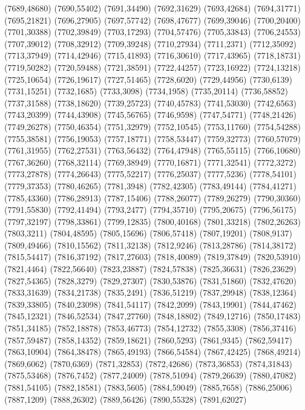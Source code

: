 (7689,48680)
(7690,55402)
(7691,34490)
(7692,31629)
(7693,42684)
(7694,31771)
(7695,21821)
(7696,27905)
(7697,57742)
(7698,47677)
(7699,39046)
(7700,20400)
(7701,30388)
(7702,39849)
(7703,17293)
(7704,57476)
(7705,33843)
(7706,24553)
(7707,39012)
(7708,32912)
(7709,39248)
(7710,27934)
(7711,2371)
(7712,35092)
(7713,37949)
(7714,42946)
(7715,41893)
(7716,30610)
(7717,43965)
(7718,18731)
(7719,50282)
(7720,59488)
(7721,38591)
(7722,44257)
(7723,16922)
(7724,13218)
(7725,10654)
(7726,19617)
(7727,51465)
(7728,6020)
(7729,44956)
(7730,6139)
(7731,15251)
(7732,1685)
(7733,3098)
(7734,1958)
(7735,20114)
(7736,58852)
(7737,31588)
(7738,18620)
(7739,25723)
(7740,45783)
(7741,53030)
(7742,6563)
(7743,20399)
(7744,43908)
(7745,56765)
(7746,9598)
(7747,54771)
(7748,21426)
(7749,26278)
(7750,46354)
(7751,32979)
(7752,10545)
(7753,11760)
(7754,54288)
(7755,38581)
(7756,19053)
(7757,18771)
(7758,53447)
(7759,32773)
(7760,57079)
(7761,31955)
(7762,27531)
(7763,56432)
(7764,47948)
(7765,55115)
(7766,10680)
(7767,36260)
(7768,32114)
(7769,38949)
(7770,16871)
(7771,32541)
(7772,3272)
(7773,27878)
(7774,26643)
(7775,52217)
(7776,25037)
(7777,5236)
(7778,54101)
(7779,37353)
(7780,46265)
(7781,3948)
(7782,42305)
(7783,49144)
(7784,41271)
(7785,43360)
(7786,28913)
(7787,15406)
(7788,26077)
(7789,26279)
(7790,30360)
(7791,55830)
(7792,41494)
(7793,2477)
(7794,35710)
(7795,20675)
(7796,56175)
(7797,32197)
(7798,33861)
(7799,12835)
(7800,40168)
(7801,33218)
(7802,26263)
(7803,3211)
(7804,48595)
(7805,15696)
(7806,57418)
(7807,19201)
(7808,9137)
(7809,49466)
(7810,15562)
(7811,32138)
(7812,9246)
(7813,28786)
(7814,38172)
(7815,54417)
(7816,37192)
(7817,27603)
(7818,40089)
(7819,37849)
(7820,53910)
(7821,4464)
(7822,56640)
(7823,23887)
(7824,57838)
(7825,36631)
(7826,23629)
(7827,54365)
(7828,3279)
(7829,27307)
(7830,53876)
(7831,51860)
(7832,47620)
(7833,31639)
(7834,21738)
(7835,2491)
(7836,51219)
(7837,29948)
(7838,12364)
(7839,33805)
(7840,23098)
(7841,54117)
(7842,2099)
(7843,19901)
(7844,47462)
(7845,12321)
(7846,52534)
(7847,27760)
(7848,18802)
(7849,12716)
(7850,17483)
(7851,34185)
(7852,18878)
(7853,46773)
(7854,12732)
(7855,3308)
(7856,37416)
(7857,59487)
(7858,14352)
(7859,18621)
(7860,5293)
(7861,9345)
(7862,59417)
(7863,10904)
(7864,38478)
(7865,49193)
(7866,54584)
(7867,42425)
(7868,49214)
(7869,6062)
(7870,6369)
(7871,32853)
(7872,42686)
(7873,36853)
(7874,31843)
(7875,53468)
(7876,7452)
(7877,24009)
(7878,51094)
(7879,26639)
(7880,47082)
(7881,54105)
(7882,18581)
(7883,5605)
(7884,59049)
(7885,7658)
(7886,25006)
(7887,1209)
(7888,26302)
(7889,56426)
(7890,55328)
(7891,62027)

